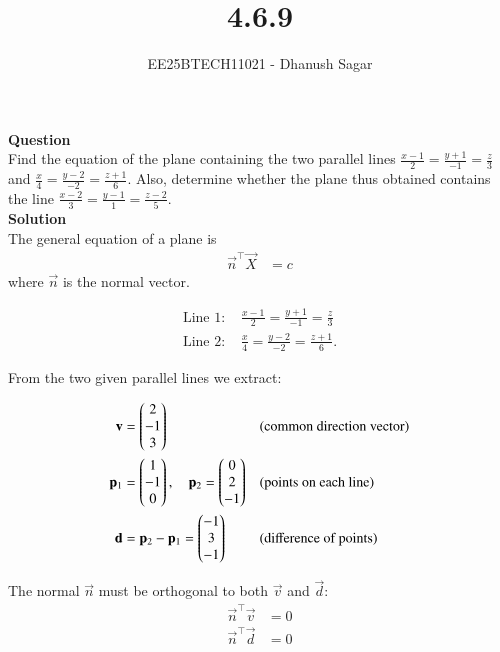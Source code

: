 \documentclass[journal]{IEEEtran}
\begin{document}



\title{4.6.9}
\author{EE25BTECH11021 - Dhanush Sagar}

{\let\newpage\relax\maketitle}

\renewcommand{\thefigure}{\theenumi}
\renewcommand{\thetable}{\theenumi}
\setlength{\intextsep}{10pt} %
\renewcommand{\thetable}{\theenumi}
\textbf{Question} \\
Find the equation of the plane containing the two parallel lines 
$\frac{x-1}{2} = \frac{y+1}{-1} = \frac{z}{3}$ and 
$\frac{x}{4} = \frac{y-2}{-2} = \frac{z+1}{6}$. 
Also, determine whether the plane thus obtained contains the line 
$\frac{x-2}{3} = \frac{y-1}{1} = \frac{z-2}{5}$.\\


\textbf{Solution} \\
The general equation of a plane is
\begin{align}
\vec{n}^\top \vec{X} &= c
\end{align}
where $\vec{n}$ is the normal vector.

\noindent
\begin{align}
\text{Line 1: } & \frac{x-1}{2} = \frac{y+1}{-1} = \frac{z}{3} \\
\text{Line 2: } & \frac{x}{4} = \frac{y-2}{-2} = \frac{z+1}{6}.
\end{align}

From the two given parallel lines we extract:

\begin{align}
\mathbf{v} &= \begin{pmatrix}2\\-1\\3\end{pmatrix} 
&& \text{(common direction vector)} \\
\mathbf{p}_1 &= \begin{pmatrix}1\\-1\\0\end{pmatrix}, \quad 
\mathbf{p}_2 = \begin{pmatrix}0\\2\\-1\end{pmatrix} 
&& \text{(points on each line)} \\
\mathbf{d} &= \mathbf{p}_2 - \mathbf{p}_1 = \begin{pmatrix}-1\\3\\-1\end{pmatrix}
&& \text{(difference of points)}
\end{align}

\noindent
The normal $\vec{n}$ must be orthogonal to both $\vec{v}$ and $\vec{d}$:
\begin{align}
\vec{n}^\top \vec{v} &= 0 \\
\vec{n}^\top \vec{d} &= 0
\end{align}
\end{document}
